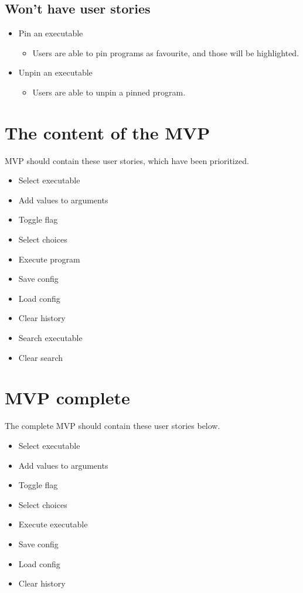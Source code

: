 \documentclass{article}
\begin{document}
\subsection{Won't have user stories }
\begin{itemize}
    \item Pin an executable
    \begin{itemize}
        \item Users are able to pin programs as favourite, and those will be highlighted.
    \end{itemize}
    \item Unpin an executable
    \begin{itemize}
        \item Users are able to unpin a pinned program.
    \end{itemize}
\end{itemize}

\section{The content of the MVP}
MVP should contain these user stories, which have been prioritized.
\begin{itemize}
    \item Select executable
    \item Add values to arguments
    \item Toggle flag
    \item Select choices
    \item Execute program
    \item Save config
    \item Load config
    \item Clear history
    \item Search executable
    \item Clear search
\end{itemize}

\section{MVP complete}
The complete MVP should contain these user stories below.
\begin{itemize}
    \item Select executable
    \item Add values to arguments
    \item Toggle flag
    \item Select choices
    \item Execute executable
    \item Save config
    \item Load config
    \item Clear history
\end{itemize}
\end{document}

